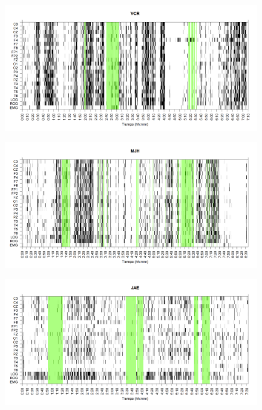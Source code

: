 \documentclass[12pt,a4paper]{mitthesis}
\begin{document}

\begin{figure}
\centering
\includegraphics[width=0.9\linewidth]
{./g170413/VCNNS1_est.png} 
\label{grf_VCR}
\end{figure}

\begin{figure}
\centering
\includegraphics[width=0.9\linewidth]
{./g170413/MJNNVIGILOS_est.png} 
\label{grf_MJH}
\end{figure}

\begin{figure}
\centering
\includegraphics[width=0.9\linewidth]
{./g170413/JANASUE_est.png} 
\label{grf_JAE}
\end{figure}
\end{document}
